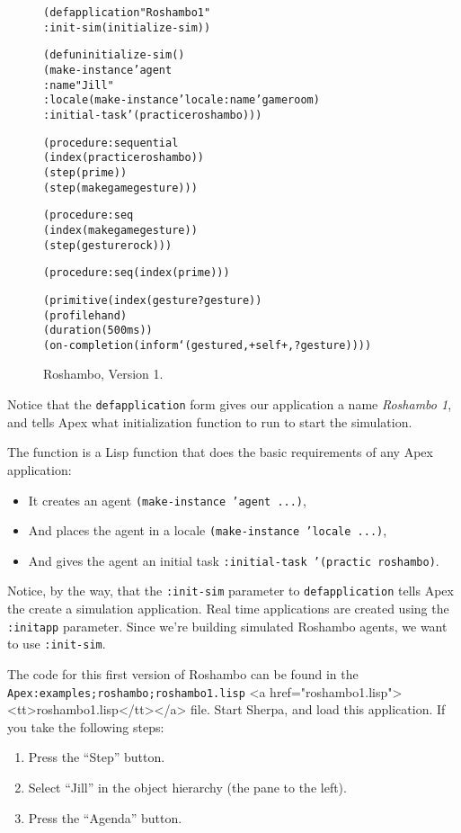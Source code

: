 \documentclass[12pt]{article}
\newcommand{\ic}{\texttt}
\newenvironment{code}%
   {\begin{alltt}}%
   {\end{alltt}}
\newenvironment{float}%
   {\begin{center}}%
   {\end{center}
   }
\newcommand{\fn}[1]{\texonly\texttt{#1}\endtexonly
  \htmlonly \rawhtml <a href="#1"><tt>#1</tt></a>\endrawhtml \endhtmlonly}
\begin{document}
\begin{figure}
\begin{float}
\begin{code}
(defapplication "Roshambo 1"
    :init-sim (initialize-sim))

(defun initialize-sim ()
  (make-instance 'agent
    :name "Jill"
    :locale (make-instance 'locale :name 'gameroom)
    :initial-task '(practice roshambo)))

(procedure :sequential 
  (index (practice roshambo))
  (step (prime))
  (step (make game gesture)))

(procedure :seq
  (index (make game gesture))
  (step (gesture rock)))

(procedure :seq (index (prime)))

(primitive (index (gesture ?gesture))
  (profile hand)
  (duration (500 ms))
  (on-completion (inform `(gestured ,+self+ ,?gesture))))
\end{code}
\end{float}
\caption{Roshambo, Version 1.\label{fig.roshambo.1}}
\end{figure}

Notice that the \ic{defapplication} form gives our application a name \textit{Roshambo 1}, and tells Apex what initialization function to run to start the simulation.

The function is a Lisp function that does the basic requirements of any Apex application: 

\begin{itemize}
\item It creates an agent \ic{(make-instance 'agent ...)},
\item And places the agent in a locale \ic{(make-instance 'locale ...)},
\item And gives the agent an initial task \ic{:initial-task '(practic roshambo)}.
\end{itemize}

Notice, by the way, that the \ic{:init-sim} parameter to \ic{defapplication} tells Apex the create a simulation application. Real time applications are created using the \ic{:initapp} parameter. Since we're building simulated Roshambo agents, we want to use \ic{:init-sim}. 

The code for this first version of Roshambo can be found in the \ic{Apex:\-examples;\-roshambo;}\fn{roshambo1.lisp} file. Start Sherpa, and load this application. If you take the following steps:

\begin{enumerate}
\item Press the ``Step'' button.
\item Select ``Jill'' in the object hierarchy (the pane to the left).
\item Press the ``Agenda'' button.
\end{enumerate}
\end{document}
